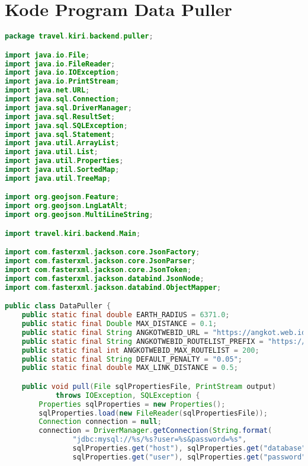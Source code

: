 \chapter{Kode Program Data Puller}

\singlespacing 
%
%
\begin{lstlisting}[language=Java,basicstyle=\tiny,caption=DataPuller.java]
package travel.kiri.backend.puller;

import java.io.File;
import java.io.FileReader;
import java.io.IOException;
import java.io.PrintStream;
import java.net.URL;
import java.sql.Connection;
import java.sql.DriverManager;
import java.sql.ResultSet;
import java.sql.SQLException;
import java.sql.Statement;
import java.util.ArrayList;
import java.util.List;
import java.util.Properties;
import java.util.SortedMap;
import java.util.TreeMap;

import org.geojson.Feature;
import org.geojson.LngLatAlt;
import org.geojson.MultiLineString;

import travel.kiri.backend.Main;

import com.fasterxml.jackson.core.JsonFactory;
import com.fasterxml.jackson.core.JsonParser;
import com.fasterxml.jackson.core.JsonToken;
import com.fasterxml.jackson.databind.JsonNode;
import com.fasterxml.jackson.databind.ObjectMapper;

public class DataPuller {
	public static final double EARTH_RADIUS = 6371.0;
	public static final Double MAX_DISTANCE = 0.1;
	public static final String ANGKOTWEBID_URL = "https://angkot.web.id/route/transportation/%s.json";
	public static final String ANGKOTWEBID_ROUTELIST_PREFIX = "https://angkot.web.id/route/transportation-list.json?id=";
	public static final int ANGKOTWEBID_MAX_ROUTELIST = 200;
	public static final String DEFAULT_PENALTY = "0.05";
	public static final double MAX_LINK_DISTANCE = 0.5;

	public void pull(File sqlPropertiesFile, PrintStream output)
			throws IOException, SQLException {
		Properties sqlProperties = new Properties();
		sqlProperties.load(new FileReader(sqlPropertiesFile));
		Connection connection = null;
		connection = DriverManager.getConnection(String.format(
				"jdbc:mysql://%s/%s?user=%s&password=%s",
				sqlProperties.get("host"), sqlProperties.get("database"),
				sqlProperties.get("user"), sqlProperties.get("password")));
		

\end{lstlisting}
